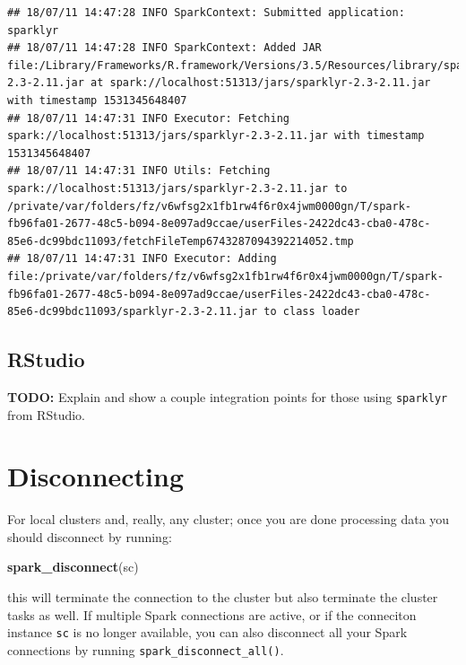 \documentclass[]{book}
\newenvironment{Shaded}{\begin{snugshade}}{\end{snugshade}}
\newcommand{\KeywordTok}[1]{\textcolor[rgb]{0.13,0.29,0.53}{\textbf{#1}}}
\newcommand{\NormalTok}[1]{#1}
\theoremstyle{definition}
\theoremstyle{definition}
\theoremstyle{definition}
\theoremstyle{remark}
\begin{document}
\begin{verbatim}
## 18/07/11 14:47:28 INFO SparkContext: Submitted application: sparklyr
## 18/07/11 14:47:28 INFO SparkContext: Added JAR file:/Library/Frameworks/R.framework/Versions/3.5/Resources/library/sparklyr/java/sparklyr-2.3-2.11.jar at spark://localhost:51313/jars/sparklyr-2.3-2.11.jar with timestamp 1531345648407
## 18/07/11 14:47:31 INFO Executor: Fetching spark://localhost:51313/jars/sparklyr-2.3-2.11.jar with timestamp 1531345648407
## 18/07/11 14:47:31 INFO Utils: Fetching spark://localhost:51313/jars/sparklyr-2.3-2.11.jar to /private/var/folders/fz/v6wfsg2x1fb1rw4f6r0x4jwm0000gn/T/spark-fb96fa01-2677-48c5-b094-8e097ad9ccae/userFiles-2422dc43-cba0-478c-85e6-dc99bdc11093/fetchFileTemp6743287094392214052.tmp
## 18/07/11 14:47:31 INFO Executor: Adding file:/private/var/folders/fz/v6wfsg2x1fb1rw4f6r0x4jwm0000gn/T/spark-fb96fa01-2677-48c5-b094-8e097ad9ccae/userFiles-2422dc43-cba0-478c-85e6-dc99bdc11093/sparklyr-2.3-2.11.jar to class loader
\end{verbatim}

\hypertarget{using-spark-from-rstudio}{%
\subsection{RStudio}\label{using-spark-from-rstudio}}

\textbf{TODO:} Explain and show a couple integration points for those
using \texttt{sparklyr} from RStudio.

\hypertarget{disconnecting}{%
\section{Disconnecting}\label{disconnecting}}

For local clusters and, really, any cluster; once you are done
processing data you should disconnect by running:

\begin{Shaded}
\begin{Highlighting}[]
\KeywordTok{spark_disconnect}\NormalTok{(sc)}
\end{Highlighting}
\end{Shaded}

this will terminate the connection to the cluster but also terminate the
cluster tasks as well. If multiple Spark connections are active, or if
the conneciton instance \texttt{sc} is no longer available, you can also
disconnect all your Spark connections by running
\texttt{spark\_disconnect\_all()}.
\end{document}
